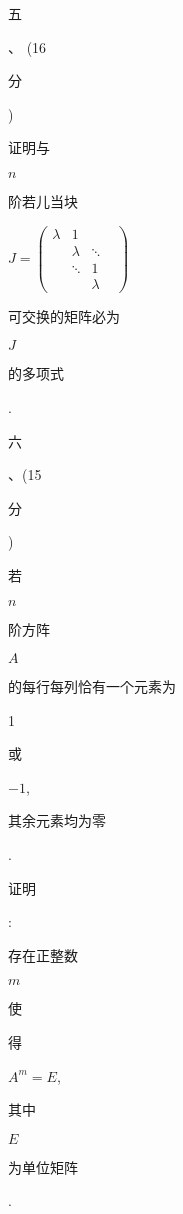 \documentclass[10pt]{article}
\begin{document}
\begin{CJK}{UTF8}{mj}五\end{CJK}、 (16 \begin{CJK}{UTF8}{mj}分\end{CJK}) \begin{CJK}{UTF8}{mj}证明与\end{CJK} $n$ \begin{CJK}{UTF8}{mj}阶若儿当块\end{CJK} $J=\left(\begin{array}{cccc}\lambda & 1 & & \\ & \lambda & \ddots & \\ & \ddots & 1 \\ & & \lambda\end{array}\right)$ \begin{CJK}{UTF8}{mj}可交换的矩阵必为\end{CJK} $J$ \begin{CJK}{UTF8}{mj}的多项式\end{CJK}.

\begin{CJK}{UTF8}{mj}六\end{CJK}、(15 \begin{CJK}{UTF8}{mj}分\end{CJK}) \begin{CJK}{UTF8}{mj}若\end{CJK} $n$ \begin{CJK}{UTF8}{mj}阶方阵\end{CJK} $A$ \begin{CJK}{UTF8}{mj}的每行每列恰有一个元素为\end{CJK} 1 \begin{CJK}{UTF8}{mj}或\end{CJK} $-1$, \begin{CJK}{UTF8}{mj}其余元素均为零\end{CJK}. \begin{CJK}{UTF8}{mj}证明\end{CJK}: \begin{CJK}{UTF8}{mj}存在正整数\end{CJK} $m$ \begin{CJK}{UTF8}{mj}使\end{CJK} \begin{CJK}{UTF8}{mj}得\end{CJK} $A^{m}=E$, \begin{CJK}{UTF8}{mj}其中\end{CJK} $E$ \begin{CJK}{UTF8}{mj}为单位矩阵\end{CJK}.
\end{document}
